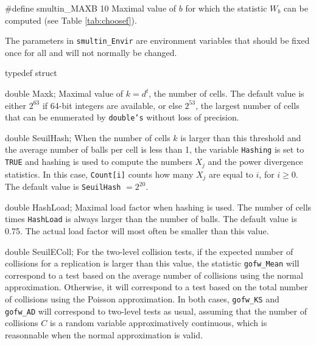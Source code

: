 #define smultin_MAXB  10
\endcode
\tab
  Maximal value of $b$ for which the statistic $W_b$
  can be computed (see Table \ref{tab:choosef}).
\endtab



The parameters in {\tt smultin\_Envir} are environment variables that 
should be fixed once for all and will not normally be changed.

\code

typedef struct {

   double Maxk;
\endcode
\tabb
   Maximal value of $k = d^t$, the number of cells. The default value is 
   either $2^{63}$ if 64-bit integers are available, or else $2^{53}$,
   the largest number of cells that can be enumerated by {\tt double's}
   without loss of precision.
\endtabb
\ifdetailed
\code

   double SeuilHash;
\endcode
\tabb
  When the number of cells $k$ is larger than this threshold and
  the average number of balls per cell is less than 1,
  the variable {\tt Hashing} is set to {\tt TRUE} and
   hashing is used to compute the numbers $X_j$ and the power divergence
  statistics.
  In this case, {\tt Count[i]} counts how many $X_j$ are
  equal to $i$, for $i \ge 0$. 
  The  default value is {\tt SeuilHash} $= 2^{20}$.
\endtabb
\code

   double HashLoad;
\endcode
\tabb
  Maximal load factor when  hashing is used. The number 
  of cells times {\tt HashLoad} is always larger than the number 
  of balls. The default value is 0.75. The actual load factor will
  most often be smaller than this value.
\endtabb
\code

   double SeuilEColl;
\endcode
\tabb
  For the two-level collision  tests, if the expected number of
  collisions for a replication is larger than this value, the statistic
  {\tt gofw\_Mean} will
  correspond to a test based on the average number of collisions
   using the  normal  approximation.  Otherwise, it will
  correspond to a  test  based on the total number of collisions 
   using the  Poisson approximation.
  In both cases, {\tt gofw\_KS} and {\tt gofw\_AD} will
  correspond to  two-level tests as usual, assuming that the number 
  of collisions
  $C$ is a random variable approximatively continuous, which is reasonnable
  when the normal approximation is valid.
\endtabb
\code

}
